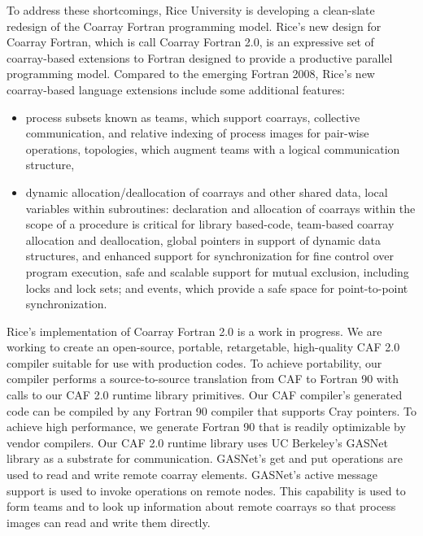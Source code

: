 To address these shortcomings, Rice University is developing a clean-slate redesign of the Coarray Fortran programming model. Rice's new design for Coarray Fortran, which is call Coarray Fortran 2.0, is an expressive set of coarray-based extensions to Fortran designed to provide a productive parallel programming model. Compared to the emerging Fortran 2008, Rice's new coarray-based language extensions include some additional features:
\begin{itemize}
\item process subsets known as teams, which support coarrays, collective communication, and relative indexing of process images for pair-wise operations, topologies, which augment teams with a logical communication structure,
\item dynamic allocation/deallocation of coarrays and other shared data, local variables within subroutines: declaration and allocation of coarrays within the scope of a procedure is critical for library based-code, team-based coarray allocation and deallocation, global pointers in support of dynamic data structures, and enhanced support for synchronization for fine control over program execution, safe and scalable support for mutual exclusion, including locks and lock sets; and events, which provide a safe space for point-to-point synchronization.
\end{itemize}
Rice's implementation of Coarray Fortran 2.0 is a work in progress. We are working to create an open-source, portable, retargetable, high-quality CAF 2.0 compiler suitable for use with production codes. To achieve portability, our compiler performs a source-to-source translation from CAF to Fortran 90 with calls to our CAF 2.0 runtime library primitives. Our CAF compiler's generated code can be compiled by any Fortran 90 compiler that supports Cray pointers. To achieve high performance, we generate Fortran 90 that is readily optimizable by vendor compilers. Our CAF 2.0 runtime library uses UC Berkeley's GASNet library as a substrate for communication. GASNet's get and put operations are used to read and write remote coarray elements. GASNet's active message support is used to invoke operations on remote nodes. This capability is used to form teams and to look up information about remote coarrays so that process images can read and write them directly.